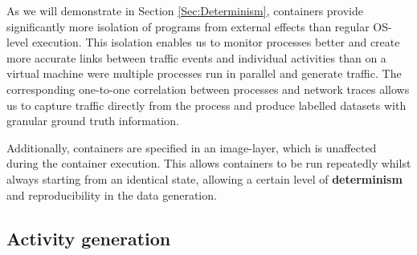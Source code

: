 \documentclass[runningheads]{llncs}
\begin{document}
As we will demonstrate in Section \ref{Sec:Determinism}, containers provide significantly more isolation of programs from external effects than regular OS-level execution. This isolation enables us to monitor processes better and create more accurate links between traffic events and individual activities than on a virtual machine were multiple processes run in parallel and generate traffic. The corresponding one-to-one correlation between processes and network traces allows us to capture traffic directly from the process and produce labelled datasets with granular ground truth information.

Additionally, containers are specified in an image-layer, which is unaffected during the container execution. This allows containers to be run repeatedly whilst always starting from an identical state, allowing a certain level of \textbf{determinism} and reproducibility in the data generation.%

 

\subsection{Activity generation}\label{Sec:Scenarios}
\end{document}
